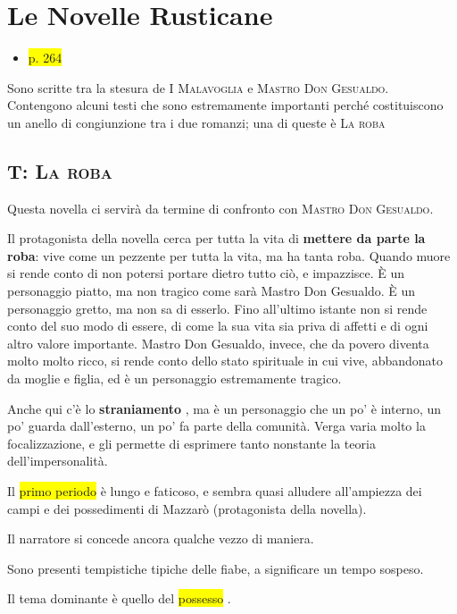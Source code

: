 \documentclass{book}
\newcommand{\pagine}[1]{\colorbox{yellow}{#1}}
\newcommand{\evidenziatore}[1]{\textbf{#1}}
\begin{document}
\section{Le Novelle Rusticane}

\begin{itemize}
\item
  \pagine{p. 264}
\end{itemize}

Sono scritte tra la stesura de \textsc{I Malavoglia} e \textsc{Mastro Don
Gesualdo}. Contengono alcuni testi che sono estremamente importanti
perché costituiscono un anello di congiunzione tra i due romanzi; una di
queste è \textsc{La roba}

\subsection{T: \textsc{La roba}}

Questa novella ci servirà da termine di confronto con \textsc{Mastro Don
Gesualdo}.

Il protagonista della novella cerca per tutta la vita di
\evidenziatore{mettere da parte la roba}: vive come un pezzente per
tutta la vita, ma ha tanta roba. Quando muore si rende conto di non
potersi portare dietro tutto ciò, e impazzisce. È un personaggio piatto,
ma non tragico come sarà Mastro Don Gesualdo. È un personaggio gretto,
ma non sa di esserlo. Fino all'ultimo istante non si rende conto del suo
modo di essere, di come la sua vita sia priva di affetti e di ogni altro
valore importante. Mastro Don Gesualdo, invece, che da povero diventa
molto molto ricco, si rende conto dello stato spirituale in cui vive,
abbandonato da moglie e figlia, ed è un personaggio estremamente
tragico.

Anche qui c'è lo \evidenziatore{straniamento} , ma è un personaggio che
un po' è interno, un po' guarda dall'esterno, un po' fa parte della
comunità. Verga varia molto la focalizzazione, e gli permette di
esprimere tanto nonstante la teoria dell'impersonalità.

Il \pagine{primo periodo} è lungo e faticoso, e sembra quasi alludere
all'ampiezza dei campi e dei possedimenti di Mazzarò (protagonista della
novella).

Il narratore si concede ancora qualche vezzo di maniera.

Sono presenti tempistiche tipiche delle fiabe, a significare un tempo
sospeso.

Il tema dominante è quello del \pagine{possesso} .
\end{document}

